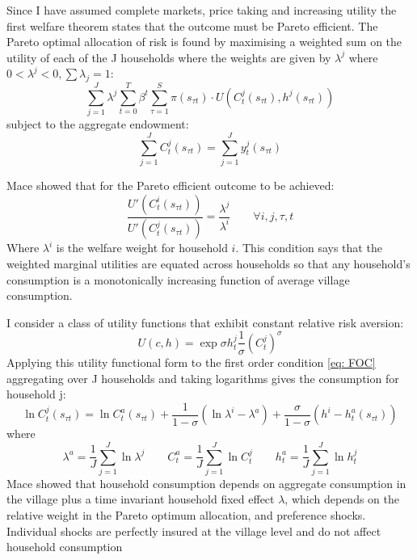 Since I have assumed complete markets, price taking and increasing utility the first welfare theorem states that the outcome must be Pareto efficient. The Pareto optimal allocation of risk is found by maximising a weighted sum on the utility of each of the J households where the weights are given by $\lambda^j$ where $0 < \lambda^j < 0, \sum\lambda_j=1 $:
\begin{equation} \label{eq: social max}
\sum_{j=1}^J \lambda^j \sum_{t=0}^{T} \beta^t \sum_{\tau=1}^{S}\pi(s_{\tau t})\cdot U(C^j_t(s_{\tau t}),h^j(s_{\tau t}))
\end{equation}
subject to the aggregate endowment:
\begin{equation}
\sum_{j=1}^J C^j_t(s_{\tau t})= \sum_{j=1}^J y_t^j(s_{\tau t})
\end{equation}

Mace showed that for the Pareto efficient outcome to be achieved:
\begin{equation} \label{eq: FOC}
\frac{U'(C^i_t(s_{\tau t}))}{U'(C^j_t(s_{\tau t}))}=\frac{\lambda^j}{\lambda^i} \qquad \forall i, j, \tau, t
\end{equation}
Where $\lambda^i$ is the welfare weight for household $i$. This condition says that the weighted marginal utilities are equated across households so that any household's consumption is a monotonically increasing function of average village consumption. 

I consider a class of utility functions that exhibit constant relative risk aversion: 
\begin{equation}
U(c,h)= \exp{\sigma h^j_t}\frac{1}{\sigma}(C^j_t)^{\sigma}
\end{equation}
Applying this utility functional form to the first order condition \eqref{eq: FOC} aggregating over J households and taking logarithms gives the consumption for household j:
\begin{equation} \label{eq: consumption app}
\ln C_t^j(s_{\tau t}) = \ln C^a_t(s_{\tau t}) + \frac{1}{1-\sigma}(\ln \lambda^i- \lambda^a) + \frac{\sigma}{1-\sigma}(h^i- h^a_t(s_{\tau t}))
\end{equation}
where
\[
\lambda^a=\frac{1}{J} \sum_{j=1}^J \ln \lambda^j \qquad C_t^a=\frac{1}{J} \sum_{j=1}^J \ln C_t^j \qquad h^a_t=\frac{1}{J} \sum_{j=1}^J \ln h_t^j
\]
Mace showed that household consumption depends on aggregate consumption in the village plus a time invariant household fixed effect $\lambda$, which depends on the relative weight in the Pareto optimum allocation, and preference shocks. Individual shocks are perfectly insured at the village level and do not affect household consumption



